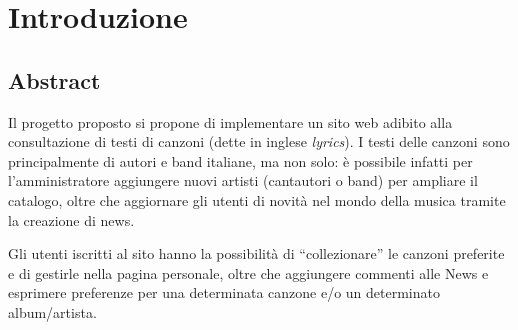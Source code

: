 \chapter{Introduzione}

\section{Abstract}
Il progetto proposto si propone di implementare un sito web adibito alla consultazione di testi di canzoni (dette in inglese \textit{lyrics}).
I testi delle canzoni sono principalmente di autori e band italiane, ma non solo: \`e possibile infatti per l'amministratore aggiungere nuovi artisti (cantautori o band) per ampliare il catalogo, oltre che aggiornare gli utenti di novit\`a nel mondo della musica tramite la creazione di news.

Gli utenti iscritti al sito hanno la possibilit\`a di ``collezionare'' le canzoni preferite e di gestirle nella pagina personale, oltre che aggiungere commenti alle News e esprimere preferenze per una determinata canzone e/o un determinato album/artista.
